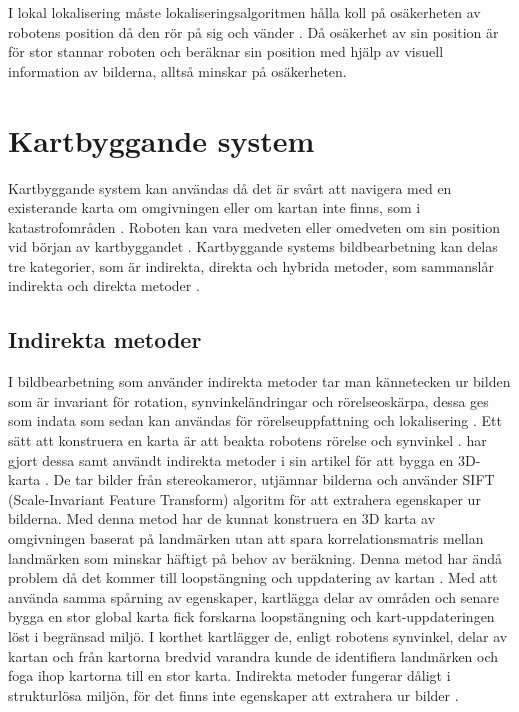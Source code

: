 I lokal lokalisering måste lokaliseringsalgoritmen hålla koll på osäkerheten av robotens position då den rör på sig och vänder \citep{772544}. Då osäkerhet av sin position är för stor stannar roboten och beräknar sin position med hjälp av visuell information av bilderna, alltså minskar på osäkerheten.

\section{Kartbyggande system}

Kartbyggande system kan användas då det är svårt att navigera med en existerande karta om omgivningen eller om kartan inte finns, som i katastrofområden \citep{geospatial}. Roboten kan vara medveten eller omedveten om sin position vid början av kartbyggandet \citep{globalsubmaps}. Kartbyggande systems bildbearbetning kan delas tre kategorier, som är indirekta, direkta och hybrida metoder, som sammanslår indirekta och direkta metoder \citep{geospatial}.

\subsection{Indirekta metoder}

I bildbearbetning som använder indirekta metoder tar man kännetecken ur bilden som är invariant för rotation, synvinkeländringar och rörelseoskärpa, dessa ges som indata som sedan kan användas för rörelseuppfattning och lokalisering \citep{geospatial}. Ett sätt att konstruera en karta är att beakta robotens rörelse och synvinkel \citep{globalsubmaps}. \cite{mapbuildingsift} har gjort dessa samt användt indirekta metoder i sin artikel  för att bygga en 3D-karta \citep{mapbuildingsift}. De tar bilder från stereokameror, utjämnar bilderna och använder SIFT (Scale-Invariant Feature Transform) algoritm för att extrahera egenskaper ur bilderna. Med denna metod har de kunnat konstruera en 3D karta av omgivningen baserat på landmärken utan att spara korrelationsmatris mellan landmärken som minskar häftigt på behov av beräkning. Denna metod har ändå problem då det kommer till loopstängning och uppdatering av kartan \citep{globalsubmaps}. Med att använda samma spårning av egenskaper, kartlägga delar av områden och senare bygga en stor global karta fick forskarna loopstängning och kart-uppdateringen löst i begränsad miljö. I korthet kartlägger de, enligt robotens synvinkel, delar av kartan och från kartorna bredvid varandra kunde de identifiera landmärken och foga ihop kartorna till en stor karta. Indirekta metoder fungerar dåligt i strukturlösa miljön, för det finns inte egenskaper att extrahera ur bilder \citep{geospatial}.

